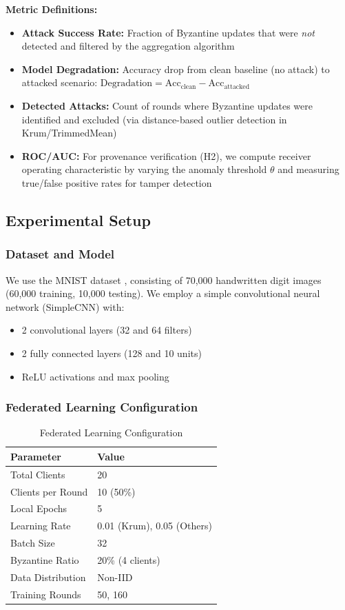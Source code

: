 \documentclass{ieeeaccess}
\begin{document}
\textbf{Metric Definitions:}
\begin{itemize}
    \item \textbf{Attack Success Rate:} Fraction of Byzantine updates that were \emph{not} detected and filtered by the aggregation algorithm
    \item \textbf{Model Degradation:} Accuracy drop from clean baseline (no attack) to attacked scenario: $\text{Degradation} = \text{Acc}_{\text{clean}} - \text{Acc}_{\text{attacked}}$
    \item \textbf{Detected Attacks:} Count of rounds where Byzantine updates were identified and excluded (via distance-based outlier detection in Krum/TrimmedMean)
    \item \textbf{ROC/AUC:} For provenance verification (H2), we compute receiver operating characteristic by varying the anomaly threshold $\theta$ and measuring true/false positive rates for tamper detection
\end{itemize}

\subsection{Experimental Setup}

\subsubsection{Dataset and Model}

We use the MNIST dataset \cite{lecun1998mnist}, consisting of 70,000 handwritten digit images (60,000 training, 10,000 testing). We employ a simple convolutional neural network (SimpleCNN) with:
\begin{itemize}
    \item 2 convolutional layers (32 and 64 filters)
    \item 2 fully connected layers (128 and 10 units)
    \item ReLU activations and max pooling
\end{itemize}

\subsubsection{Federated Learning Configuration}

\begin{table}[t]
\caption{Federated Learning Configuration}
\label{tab:fl_config}
\centering
\begin{tabular}{ll}
\toprule
\textbf{Parameter} & \textbf{Value} \\
\midrule
Total Clients & 20 \\
Clients per Round & 10 (50\%) \\
Local Epochs & 5 \\
Learning Rate & 0.01 (Krum), 0.05 (Others) \\
Batch Size & 32 \\
Byzantine Ratio & 20\% (4 clients) \\
Data Distribution & Non-IID \\
Training Rounds & 50, 160 \\
\bottomrule
\end{tabular}
\end{table}
\end{document}
